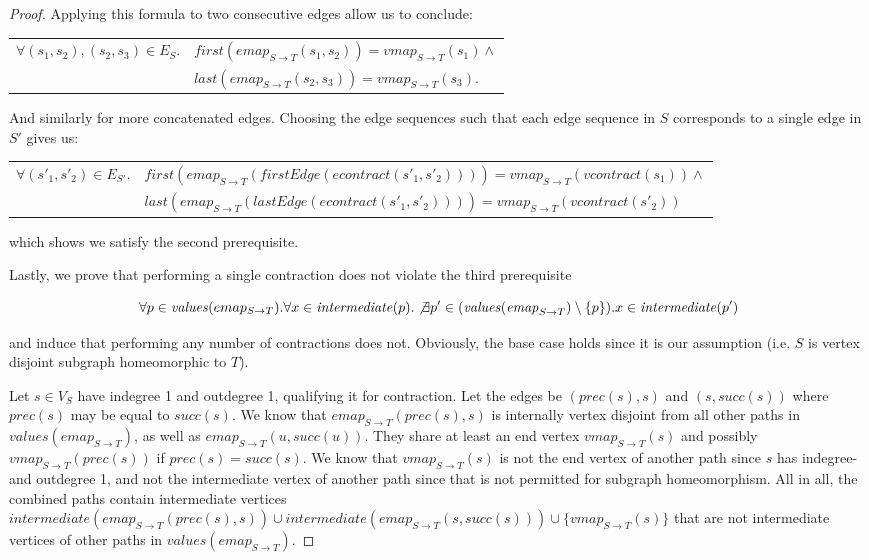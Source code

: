 \begin{proof}
Applying this formula to two consecutive edges allow us to conclude:

\begin{tabular}{ll}
$\forall(s_1, s_2), (s_2, s_3)\in E_S . $&$\mathit{first}(\mathit{emap}_{S \to T}(s_1, s_2))=\mathit{vmap}_{S \to T}(s_1)\land$\\
&$\mathit{last}(\mathit{emap}_{S \to T}(s_2, s_3))=\mathit{vmap}_{S \to T}(s_3)$. 
\end{tabular}

And similarly for more concatenated edges. Choosing the edge sequences such that each edge sequence in $S$ corresponds to a single edge in $S'$ gives us:

\begin{tabular}{ll}
$\forall(s'_1, s'_2)\in E_{S'} . $&$\mathit{first}(\mathit{emap}_{S \to T}(\mathit{firstEdge}(\mathit{econtract}(s'_1, s'_2))))=\mathit{vmap}_{S \to T}(\mathit{vcontract}(s_1))\land$\\
&$\mathit{last}(\mathit{emap}_{S \to T}(\mathit{lastEdge}(\mathit{econtract}(s'_1, s'_2))))=\mathit{vmap}_{S \to T}(\mathit{vcontract}(s'_2))$
\end{tabular}

which shows we satisfy the second prerequisite.

Lastly, we prove that performing a single contraction does not violate the third prerequisite

$$\forall p \in \mathit{values}(emap_{S \to T}) . \forall x \in \mathit{intermediate}(p) . \not \exists p' \in (\mathit{values}(\mathit{emap}_{S \to T}) \setminus \{p\}) . x \in \mathit{intermediate}(p')$$

and induce that performing any number of contractions does not. Obviously, the base case holds since it is our assumption (i.e. $S$ is vertex disjoint subgraph homeomorphic to $T$).

Let $s\in V_S$ have indegree 1 and outdegree 1, qualifying it for contraction. Let the edges be $(\mathit{prec}(s), s)$ and $(s, \mathit{succ}(s))$ where $\mathit{prec}(s)$ may be equal to $\mathit{succ}(s)$. We know that $\mathit{emap}_{S \to T}(\mathit{prec}(s), s)$ is internally vertex disjoint from all other paths in $\mathit{values}(\mathit{emap}_{S \to T})$, as well as $\mathit{emap}_{S \to T}(u, \mathit{succ}(u))$. They share at least an end vertex $\mathit{vmap}_{S \to T}(s)$ and possibly $\mathit{vmap}_{S \to T}(\mathit{prec}(s))$ if $\mathit{prec}(s)=\mathit{succ}(s)$. We know that $\mathit{vmap}_{S \to T}(s)$ is not the end vertex of another path since $s$ has indegree- and outdegree 1, and not the intermediate vertex of another path since that is not permitted for subgraph homeomorphism. All in all, the combined paths contain intermediate vertices $\mathit{intermediate}(\mathit{emap}_{S \to T}(\mathit{prec}(s), s))\cup\mathit{intermediate}(\mathit{emap}_{S \to T}(s, \mathit{succ}(s)))\cup\{\mathit{vmap}_{S \to T}(s)\}$ that are not intermediate vertices of other paths in $\mathit{values}(\mathit{emap}_{S \to T})$.


\end{proof}

